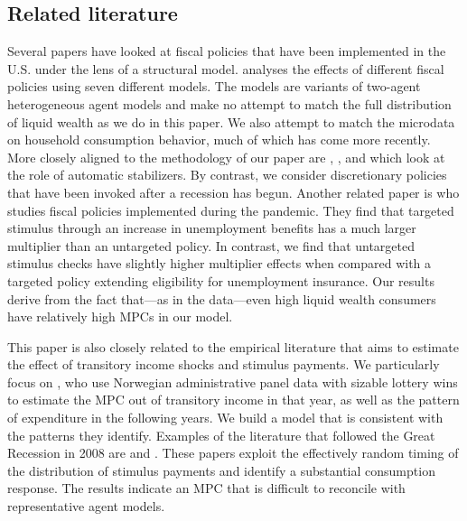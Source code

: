 \documentclass[\econtexRoot/HAFiscal]{subfiles}
\begin{document}
\hypertarget{related-literature}{}\par\subsection{Related literature}
\notinsubfile{\label{sec:lit}}

Several papers have looked at fiscal policies that have been implemented in the U.S. under the lens of a structural model. \cite{coenen2012effects} analyses the effects of different fiscal policies using seven different models. The models are variants of two-agent heterogeneous agent models and make no attempt to match the full distribution of liquid wealth as we do in this paper. We also attempt to match the microdata on household consumption behavior, much of which has come more recently.  More closely aligned to the methodology of our paper are \cite{mckay2016role}, \cite{mckay2021optimal}, and \cite{phan2024welfare} which look at the role of automatic stabilizers. By contrast, we consider discretionary policies that have been invoked after a recession has begun. Another related paper is \cite{bayercoronavirus} who studies fiscal policies implemented during the pandemic. They find that targeted stimulus through an increase in unemployment benefits has a much larger multiplier than an untargeted policy. In contrast, we find that untargeted stimulus checks have slightly higher multiplier effects when compared with a targeted policy extending eligibility for unemployment insurance. Our results derive from the fact that---as in the data---even high liquid wealth consumers have relatively high MPCs in our model.

This paper is also closely related to the empirical literature that aims to estimate the effect of transitory income shocks and stimulus payments. We particularly focus on \cite{fagereng_mpc_2021}, who use Norwegian administrative panel data with sizable lottery wins to estimate the MPC out of transitory income in that year, as well as the pattern of expenditure in the following years. We build a model that is consistent with the patterns they identify. Examples of the literature that followed the Great Recession in 2008 are \cite{parker2013consumer} and \cite{broda2014economic}. These papers exploit the effectively random timing of the distribution of stimulus payments and identify a substantial consumption response. The results indicate an MPC that is difficult to reconcile with representative agent models.
\end{document}
